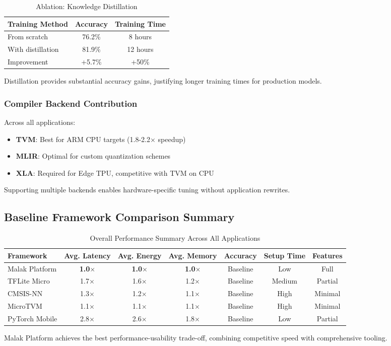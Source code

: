 \begin{table}[h]
\centering
\caption{Ablation: Knowledge Distillation}
\label{tab:ablation_kd}
\begin{tabular}{lcc}
\hline
\textbf{Training Method} & \textbf{Accuracy} & \textbf{Training Time} \\
\hline
From scratch & 76.2\% & 8 hours \\
With distillation & 81.9\% & 12 hours \\
Improvement & +5.7\% & +50\% \\
\hline
\end{tabular}
\end{table}

Distillation provides substantial accuracy gains, justifying longer training times for production models.

\subsubsection{Compiler Backend Contribution}

Across all applications:
\begin{itemize}
\item \textbf{TVM}: Best for ARM CPU targets (1.8-2.2$\times$ speedup)
\item \textbf{MLIR}: Optimal for custom quantization schemes
\item \textbf{XLA}: Required for Edge TPU, competitive with TVM on CPU
\end{itemize}

Supporting multiple backends enables hardware-specific tuning without application rewrites.

\subsection{Baseline Framework Comparison Summary}

\begin{table}[t]
\centering
\caption{Overall Performance Summary Across All Applications}
\label{tab:summary}
\begin{tabular}{lcccccc}
\hline
\textbf{Framework} & \textbf{Avg. Latency} & \textbf{Avg. Energy} & \textbf{Avg. Memory} & \textbf{Accuracy} & \textbf{Setup Time} & \textbf{Features} \\
\hline
Malak Platform & \textbf{1.0$\times$} & \textbf{1.0$\times$} & \textbf{1.0$\times$} & Baseline & Low & Full \\
TFLite Micro & 1.7$\times$ & 1.6$\times$ & 1.2$\times$ & Baseline & Medium & Partial \\
CMSIS-NN & 1.3$\times$ & 1.2$\times$ & 1.1$\times$ & Baseline & High & Minimal \\
MicroTVM & 1.1$\times$ & 1.1$\times$ & 1.1$\times$ & Baseline & High & Minimal \\
PyTorch Mobile & 2.8$\times$ & 2.6$\times$ & 1.8$\times$ & Baseline & Low & Partial \\
\hline
\end{tabular}
\end{table}

Malak Platform achieves the best performance-usability trade-off, combining competitive speed with comprehensive tooling.
